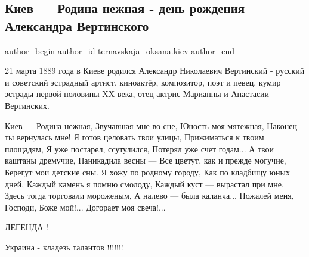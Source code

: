  
 
 
 
 
 
\subsection{Киев — Родина нежная - день рождения Александра Вертинского}
\label{sec:21_03_2021.fb.ternavskaja_oksana.kiev.1.kiev_vertinskij_birthday}
 
\ifcmt
 author_begin
   author_id ternavskaja_oksana.kiev
 author_end
\fi

21 марта 1889 года в Киеве родился  Александр Николаевич Вертинский - русский и
советский эстрадный артист, киноактёр, композитор, поэт и певец, кумир эстрады
первой половины XX века, отец актрис Марианны и Анастасии Вертинских.


\begin{multicols}{2}
\obeycr
Киев — Родина нежная,
Звучавшая мне во сне,
Юность моя мятежная,
Наконец ты вернулась мне!
\smallskip
Я готов целовать твои улицы,
Прижиматься к твоим площадям,
Я уже постарел, ссутулился,
Потерял уже счет годам...
\smallskip
А твои каштаны дремучие,
Паникадила весны —
Все цветут, как и прежде могучие,
Берегут мои детские сны.
\smallskip
Я хожу по родному городу,
Как по кладбищу юных дней,
Каждый камень я помню смолоду,
Каждый куст — вырастал при мне.
\smallskip
Здесь тогда торговали мороженым,
А налево — была каланча...
Пожалей меня, Господи, Боже мой!...
Догорает моя свеча!...
\restorecr
\end{multicols}


\begin{itemize} %
ЛЕГЕНДА !

Украина - кладезь талантов !!!!!!!
\end{itemize} %
